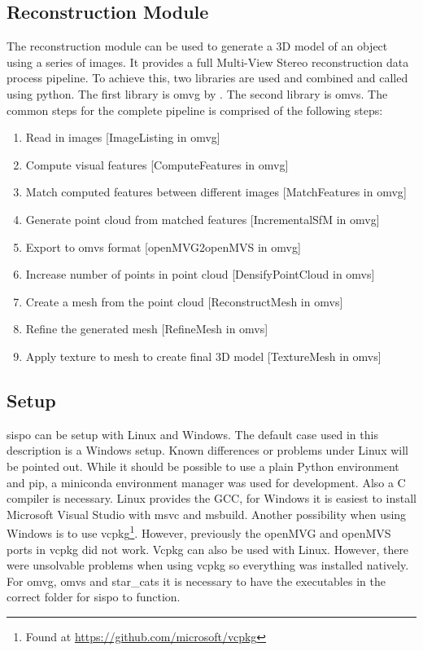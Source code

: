 \subsection{Reconstruction Module}
The reconstruction module can be used to generate a 3D model of an object using a series of images. It provides a full Multi-View Stereo reconstruction data process pipeline. To achieve this, two libraries are used and combined and called using python. The first library is \gls{omvg} by \cite{openMVG}. The second library is \gls{omvs}. 
The common steps for the complete pipeline is comprised of the following steps:
\begin{enumerate}
    \item Read in images [ImageListing in \gls{omvg}]
    \item Compute visual features [ComputeFeatures in \gls{omvg}]
    \item Match computed features between different images [MatchFeatures in \gls{omvg}]
    \item Generate point cloud from matched features [IncrementalSfM in \gls{omvg}]
    \item Export to \gls{omvs} format [openMVG2openMVS in \gls{omvg}]
    \item Increase number of points in point cloud [DensifyPointCloud in \gls{omvs}]
    \item Create a mesh from the point cloud [ReconstructMesh in \gls{omvs}]
    \item Refine the generated mesh [RefineMesh in \gls{omvs}]
    \item Apply texture to mesh to create final 3D model [TextureMesh in \gls{omvs}]
\end{enumerate}

\subsection{Setup} \label{sec:setup}
\gls{sispo} can be setup with Linux and Windows. The default case used in this description is a Windows setup. Known differences or problems under Linux will be pointed out. While it should be possible to use a plain Python environment and pip, a miniconda environment manager was used for development. Also a C compiler is necessary. Linux provides the GCC, for Windows it is easiest to install Microsoft Visual Studio with \gls{msvc} and \gls{msbuild}. Another possibility when using Windows is to use vcpkg\footnote{Found at \url{https://github.com/microsoft/vcpkg}}. However, previously the openMVG and openMVS ports in vcpkg did not work. Vcpkg can also be used with Linux. However, there were unsolvable problems when using vcpkg so everything was installed natively.
For \gls{omvg}, \gls{omvs} and star\_cats it is necessary to have the executables in the correct folder for \gls{sispo} to function.\newline

